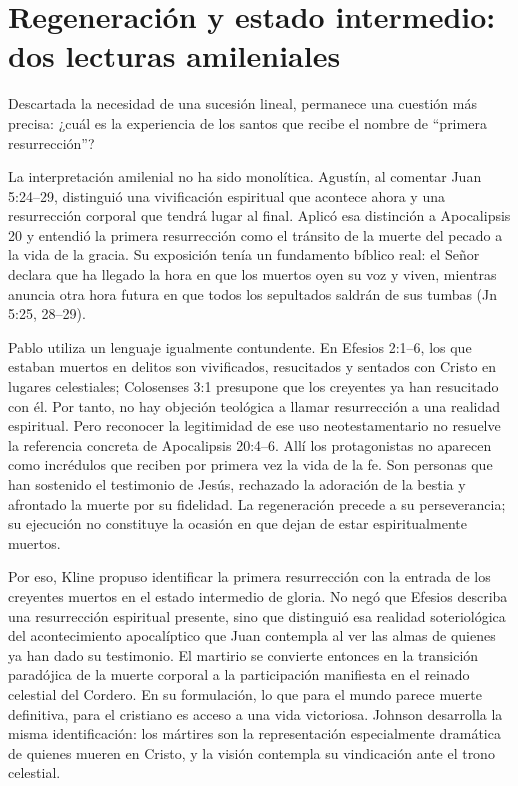 \section{Regeneración y estado intermedio: dos lecturas amileniales}

Descartada la necesidad de una sucesión lineal, permanece una cuestión más precisa: ¿cuál es la experiencia de los santos que recibe el nombre de \enquote{primera resurrección}?

La interpretación amilenial no ha sido monolítica.
Agustín, al comentar Juan 5:24--29, distinguió una vivificación espiritual que acontece ahora y una resurrección corporal que tendrá lugar al final.
Aplicó esa distinción a Apocalipsis 20 y entendió la primera resurrección como el tránsito de la muerte del pecado a la vida de la gracia.
Su exposición tenía un fundamento bíblico real: el Señor declara que ha llegado la hora en que los muertos oyen su voz y viven, mientras anuncia otra hora futura en que todos los sepultados saldrán de sus tumbas (Jn 5:25, 28--29). \autocite{augustin}

Pablo utiliza un lenguaje igualmente contundente.
En Efesios 2:1--6, los que estaban muertos en delitos son vivificados, resucitados y sentados con Cristo en lugares celestiales; Colosenses 3:1 presupone que los creyentes ya han resucitado con él.
Por tanto, no hay objeción teológica a llamar resurrección a una realidad espiritual.
Pero reconocer la legitimidad de ese uso neotestamentario no resuelve la referencia concreta de Apocalipsis 20:4--6.
Allí los protagonistas no aparecen como incrédulos que reciben por primera vez la vida de la fe.
Son personas que han sostenido el testimonio de Jesús, rechazado la adoración de la bestia y afrontado la muerte por su fidelidad.
La regeneración precede a su perseverancia; su ejecución no constituye la ocasión en que dejan de estar espiritualmente muertos.

Por eso, Kline propuso identificar la primera resurrección con la entrada de los creyentes muertos en el estado intermedio de gloria.
No negó que Efesios describa una resurrección espiritual presente, sino que distinguió esa realidad soteriológica del acontecimiento apocalíptico que Juan contempla al ver las almas de quienes ya han dado su testimonio.
El martirio se convierte entonces en la transición paradójica de la muerte corporal a la participación manifiesta en el reinado celestial del Cordero.
En su formulación, lo que para el mundo parece muerte definitiva, para el cristiano es acceso a una vida victoriosa. \autocite[370--374]{kline1975}
Johnson desarrolla la misma identificación: los mártires son la representación especialmente dramática de quienes mueren en Cristo, y la visión contempla su vindicación ante el trono celestial. \autocite{johnson2001,johnson2024}

